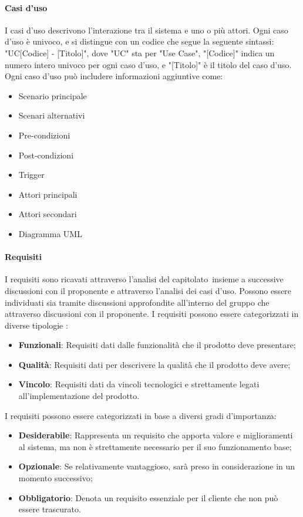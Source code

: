 \paragraph{Casi d'uso}\label{Casi} 
I casi d'uso descrivono l'interazione tra il sistema e uno o più attori. Ogni caso d'uso è univoco, e si distingue con un codice che segue la seguente sintassi: "UC[Codice] - [Titolo]",
dove "UC" sta per "Use Case", "[Codice]" indica un numero intero univoco per ogni caso d'uso, e "[Titolo]" è il titolo del caso d'uso. 
Ogni caso d'uso può includere informazioni aggiuntive come:
\begin{itemize}
    \item Scenario principale
    \item Scenari alternativi
    \item Pre-condizioni
    \item Post-condizioni
    \item Trigger
    \item Attori principali
    \item Attori secondari
    \item Diagramma UML
\end{itemize}

\paragraph{Requisiti} 
I requisiti sono ricavati attraverso l’analisi del capitolato\glo\ insieme a successive discussioni con il proponente e attraverso l’analisi dei casi d’uso.
Possono essere individuati sia tramite discussioni approfondite all’interno del gruppo che attraverso discussioni con il proponente.
I requisiti possono essere categorizzati in diverse tipologie : 
\begin{itemize}
    \item \textbf{Funzionali}: Requisiti dati dalle funzionalità che il prodotto deve presentare;
    \item \textbf{Qualità}: Requisiti dati per descrivere la qualità che il prodotto deve avere;
    \item \textbf{Vincolo}: Requisiti dati da vincoli tecnologici e strettamente legati all’implementazione del prodotto.
\end{itemize}
I requisiti possono essere categorizzati in base a diversi gradi d'importanza:
\begin{itemize}
    \item \textbf{Desiderabile}: Rappresenta un requisito che apporta valore e miglioramenti al sistema, ma non è strettamente necessario per il suo funzionamento base;
    \item \textbf{Opzionale}: Se relativamente vantaggioso, sarà preso in considerazione in un momento successivo;
    \item \textbf{Obbligatorio}: Denota un requisito essenziale per il cliente che non può essere trascurato.
\end{itemize}

